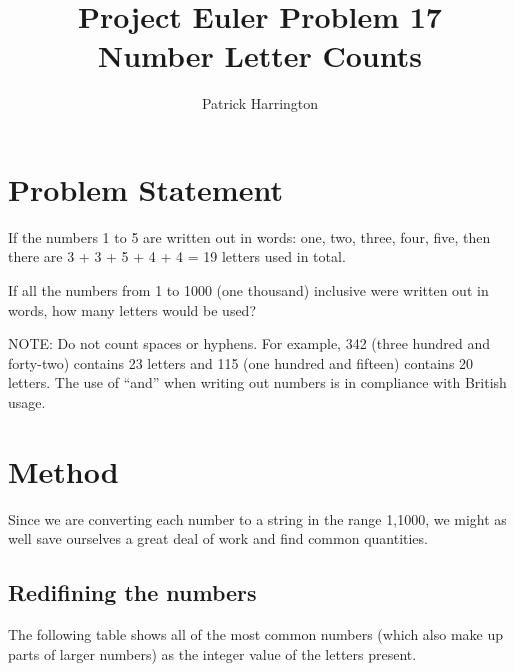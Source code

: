 \documentclass{article}
\title{Project Euler Problem 17\\Number Letter Counts}
\author{Patrick Harrington}
\begin{document}
\maketitle
\section{Problem Statement}
If the numbers 1 to 5 are written out in words: one, two, three, four,
five, then there are 3 + 3 + 5 + 4 + 4 = 19 letters used in total.

If all the numbers from 1 to 1000 (one thousand) inclusive were written out
in words, how many letters would be used?


NOTE: Do not count spaces or hyphens. For example, 342 (three hundred and
forty-two) contains 23 letters and 115 (one hundred and fifteen) contains 20
letters. The use of ``and'' when writing out numbers is in compliance with
British usage.

\section{Method}
Since we are converting each number to a string in the range {1,1000}, we
might as well save ourselves a great deal of work and find common quantities.
\subsection{Redifining the numbers}

The following table shows all of the most common numbers (which also make up
parts of larger numbers) as the integer value of the letters present.
\end{document}
